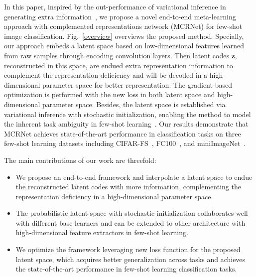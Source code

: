 \documentclass[10pt,conference,a4paper]{IEEEtran}
\begin{document}
In this paper, inspired by the out-performance of variational inference in generating extra information~\cite{kingma2014auto-encoding, DBLP:conf/cvpr/YeZYC19}, we propose a novel end-to-end meta-learning approach with complemented representations network (MCRNet) for few-shot image classification. Fig.~\ref{overview} overviews the proposed method. Specially, our approach embeds a latent space based on low-dimensional features learned from raw samples through encoding convolution layers. Then latent codes \textbf{z}, reconstructed in this space, are endued extra representation information to complement the representation deficiency and will be decoded in a high-dimensional parameter space for better representation. The gradient-based optimization is performed with the new loss in both latent space and high-dimensional parameter space. Besides, the latent space is established via variational inference with stochastic initialization, enabling the method to model the inherent task ambiguity in few-shot learning~\cite{PLATIPUS2018}. Our results demonstrate that MCRNet achieves state-of-the-art performance in classification tasks on three few-shot learning datasets including CIFAR-FS~\cite{bertinetto2019meta}, FC100~\cite{oreshkin2018tadam}, and miniImageNet~\cite{ravi2017optimization, vinyals2016matching}.

The main contributions of our work are threefold: 
\begin{itemize}
	\item We propose an end-to-end framework and interpolate a latent space to endue the reconstructed latent codes with more information, complementing the representation deficiency in a high-dimensional parameter space.
	\item The probabilistic latent space with stochastic initialization collaborates well with different base-learners and can be extended to other architecture with high-dimensional feature extractors in few-shot learning.
	\item We optimize the framework leveraging new loss function for the proposed latent space, which acquires better generalization across tasks and achieves the state-of-the-art performance in few-shot learning classification tasks.
\end{itemize}
\end{document}
